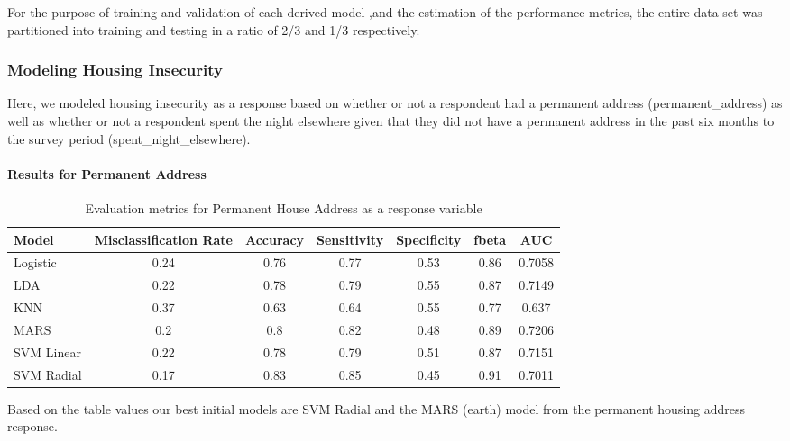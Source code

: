 \documentclass[
  10pt,
]{article}
\begin{document}
For the purpose of training and validation of each derived model ,and the estimation of the performance metrics, the entire data set was partitioned into training and testing in a ratio of 2/3 and 1/3 respectively.

\hypertarget{modeling-housing-insecurity}{%
\subsubsection{Modeling Housing Insecurity}\label{modeling-housing-insecurity}}

Here, we modeled housing insecurity as a response based on whether or not a respondent had a permanent address (permanent\_address) as well as whether or not a respondent spent the night elsewhere given that they did not have a permanent address in the past six months to the survey period (spent\_night\_elsewhere).

\hypertarget{results-for-permanent-address}{%
\paragraph{Results for Permanent Address}\label{results-for-permanent-address}}

\newline

\begin{table}[H]

\caption{\label{tab:unnamed-chunk-9}Evaluation metrics for Permanent House Address  as a response variable}
\centering
\fontsize{12}{14}\selectfont
\begin{tabular}[t]{lcccccc}
\toprule
Model & Misclassification Rate & Accuracy & Sensitivity & Specificity & fbeta & AUC\\
\midrule
Logistic & 0.24 & 0.76 & 0.77 & 0.53 & 0.86 & 0.7058\\
LDA & 0.22 & 0.78 & 0.79 & 0.55 & 0.87 & 0.7149\\
KNN & 0.37 & 0.63 & 0.64 & 0.55 & 0.77 & 0.637\\
MARS & 0.2 & 0.8 & 0.82 & 0.48 & 0.89 & 0.7206\\
SVM Linear & 0.22 & 0.78 & 0.79 & 0.51 & 0.87 & 0.7151\\
SVM Radial & 0.17 & 0.83 & 0.85 & 0.45 & 0.91 & 0.7011\\
\bottomrule
\end{tabular}
\end{table}

Based on the table values our best initial models are SVM Radial and the MARS (earth) model from the permanent housing address response.\\
\end{document}

